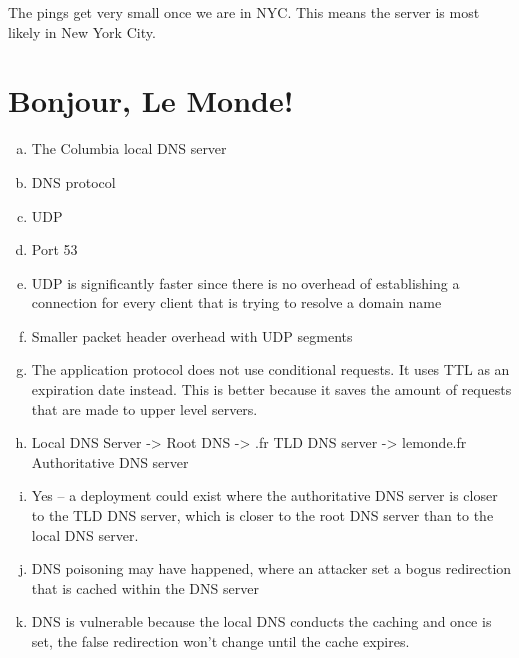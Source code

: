 \documentclass[11pt]{article}
\begin{document}
\begin{enumerate}[(a)]
      The pings get very small once we are in NYC. This means the server is most
      likely in New York City.
  \end{enumerate}

\section*{Bonjour, Le Monde!}
  \begin{enumerate}[(a)]
    \item The Columbia local DNS server
    \item DNS protocol
    \item UDP
    \item Port 53
    \item UDP is significantly faster since there is no overhead of establishing
          a connection for every client that is trying to resolve a domain name
    \item Smaller packet header overhead with UDP segments
    \item The application protocol does not use conditional requests. It uses TTL
          as an expiration date instead. This is better because it saves the amount
          of requests that are made to upper level servers.
    \item Local DNS Server -> Root DNS -> .fr TLD DNS server -> lemonde.fr Authoritative DNS server
    \item Yes -- a deployment could exist where the authoritative DNS server is closer
          to the TLD DNS server, which is closer to the root DNS server than
          to the local DNS server.
    \item DNS poisoning may have happened, where an attacker set a bogus redirection
          that is cached within the DNS server
    \item DNS is vulnerable because the local DNS conducts the caching and once
          is set, the false redirection won't change until the cache expires.
  \end{enumerate}
\end{document}
